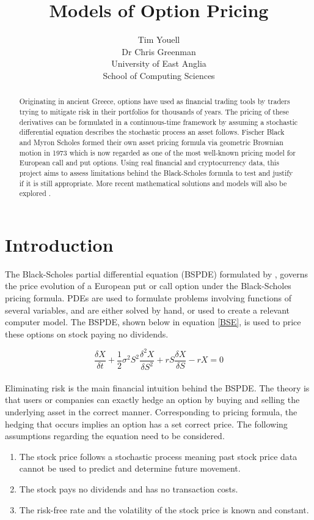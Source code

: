 \documentclass[12pt]{article}
\title{Models of Option Pricing}
\author{Tim Youell\\Dr Chris Greenman\\ University of East Anglia\\School of Computing Sciences}
\begin{document}
\maketitle

\begin{abstract}
Originating in ancient Greece, options have used as financial trading tools by traders trying to mitigate risk in their portfolios for thousands of years. The pricing of these derivatives can be formulated in a continuous-time framework by assuming a stochastic differential equation describes the stochastic process an asset follows. Fischer Black and Myron Scholes formed their own asset pricing formula via geometric Brownian motion in 1973 which is now regarded as one of the most well-known pricing model for European call and put options. Using real financial and cryptocurrency data, this project aims to assess limitations behind the Black-Scholes formula to test and justify if it is still appropriate. More recent mathematical solutions and models will also be explored \citep{Lucy} \citep{Lucy2}\citep{Lucy3}.
\end{abstract}

\tableofcontents

\section{Introduction}  
The Black-Scholes partial differential equation (BSPDE) formulated by \cite{BSReport}, governs the price evolution of a European put or call option under the Black-Scholes pricing formula. PDEs are used to formulate problems involving functions of several variables, and are either solved by hand, or used to create a relevant computer model. The BSPDE, shown below in equation \ref{BSE}, is used to price these options on stock paying no dividends.


\begin{equation} \label{BSE}
\frac{\delta X}{\delta t} 
+ \frac{1}{2}\sigma^2 S^2\frac{\delta^2 X}{\delta S^2} 
+ rS\frac{\delta X}{\delta S}
-rX
=0
\end{equation}
\\
Eliminating risk is the main financial intuition behind the BSPDE. The theory is that users or companies can exactly hedge an option by buying and selling the underlying asset in the correct manner. Corresponding to \cite{BSReport} pricing formula, the hedging that occurs implies an option has a set correct price. The following assumptions regarding the equation need to be considered. 
\begin{enumerate}
	\item The stock price follows a stochastic process meaning past stock price data cannot be used to predict and determine future movement. 
	\item The stock pays no dividends and has no transaction costs. 
	\item The risk-free rate and the volatility of the stock price is known and constant. 
\end{enumerate} 
\end{document}
